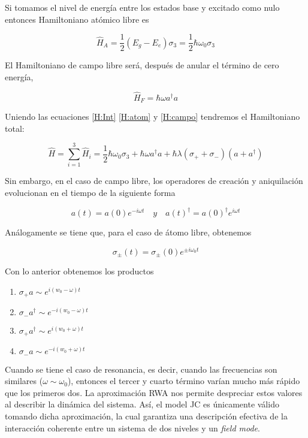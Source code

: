\documentclass[spanish]{article}
\begin{document}
Si tomamos el nivel de energía entre los estados base y excitado como nulo entonces Hamiltoniano atómico libre es 

\begin{equation}
\hat{H}_A = \frac{1}{2}(E_g-E_e)\sigma_3 = \frac{1}{2}\hbar \omega_0\sigma_3
\label{H:atom}
\end{equation}

El Hamiltoniano de campo libre será, después de anular el término de cero energía,

\begin{equation}
\hat{H}_F  = \hbar \omega a^\dagger a
\label{H:campo}
\end{equation} 

Uniendo las ecuaciones \ref{H:Int} \ref{H:atom} y \ref{H:campo} tendremos el Hamiltoniano total:

\begin{equation}
\hat{H} = \sum_{i=1}^3 \hat{H}_i = \frac{1}{2}\hbar \omega_0\sigma_3 + \hbar \omega a^\dagger a + \hbar\lambda(\sigma_+ + \sigma_-)(a+a^\dagger)
\end{equation}

Sin embargo, en el caso de campo libre, los operadores de creación y aniquilación evolucionan en el tiempo de la siguiente forma

\begin{equation}
a(t) = a(0)e^{-i\omega t} \quad y \quad a(t)^\dagger = a(0)^\dagger e^{i\omega t}
\end{equation}

Análogamente se tiene que, para el caso de átomo libre, obtenemos

\begin{equation}
\sigma_{\pm}(t) = \sigma_{\pm}(0)e^{\pm i\omega_0 t} 
\end{equation}

Con lo anterior obtenemos los productos

\begin{enumerate}
\item $\sigma_+ a \sim e^{i(w_0-\omega)t}$
\item $\sigma_- a^\dagger \sim e^{-i(w_0-\omega)t}$
\item $\sigma_+ a^\dagger \sim e^{i(w_0+\omega)t}$
\item $\sigma_- a \sim e^{-i(w_0+\omega)t}$

\end{enumerate}

Cuando se tiene el caso de resonancia, es decir, cuando las frecuencias son similares ($\omega \sim \omega_0$), entonces el tercer y cuarto término varían mucho más rápido que los primeros dos. La aproximación RWA nos permite despreciar estos valores al describir la dinámica del sistema. Así, el model JC es únicamente válido tomando dicha aproximación, la cual garantiza una descripción efectiva de la interacción coherente entre un sistema de dos niveles y un \textit{field mode}. 
\end{document}
